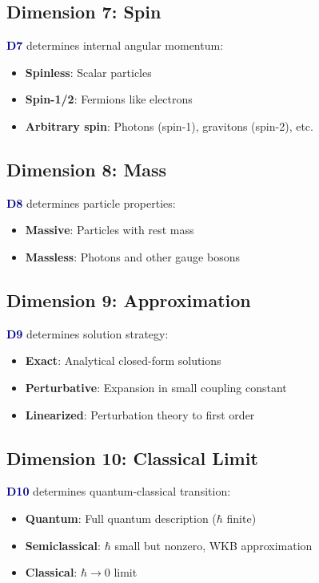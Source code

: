 \documentclass[12pt,openany,oneside]{book}
\newcommand{\dimensionindex}[1]{\textcolor{darkblue}{\textbf{D#1}}}
\begin{document}
\subsection{Dimension 7: Spin}
\dimensionindex{7} determines internal angular momentum:
\begin{itemize}
  \item \textbf{Spinless}: Scalar particles
  \item \textbf{Spin-1/2}: Fermions like electrons
  \item \textbf{Arbitrary spin}: Photons (spin-1), gravitons (spin-2), etc.
\end{itemize}

\subsection{Dimension 8: Mass}
\dimensionindex{8} determines particle properties:
\begin{itemize}
  \item \textbf{Massive}: Particles with rest mass
  \item \textbf{Massless}: Photons and other gauge bosons
\end{itemize}

\subsection{Dimension 9: Approximation}
\dimensionindex{9} determines solution strategy:
\begin{itemize}
  \item \textbf{Exact}: Analytical closed-form solutions
  \item \textbf{Perturbative}: Expansion in small coupling constant
  \item \textbf{Linearized}: Perturbation theory to first order
\end{itemize}

\subsection{Dimension 10: Classical Limit}
\dimensionindex{10} determines quantum-classical transition:
\begin{itemize}
  \item \textbf{Quantum}: Full quantum description ($\hbar$ finite)
  \item \textbf{Semiclassical}: $\hbar$ small but nonzero, WKB approximation
  \item \textbf{Classical}: $\hbar \to 0$ limit
\end{itemize}
\end{document}
